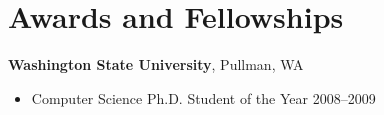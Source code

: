 \AOCLine
\section*{Awards and Fellowships }
{\bf Washington State University}, Pullman, WA
\begin{itemize}
	\item Computer Science Ph.D. Student of the Year \hfill 2008--2009
\end{itemize}

